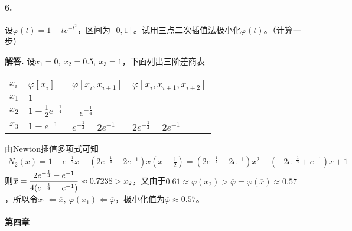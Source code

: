 \documentclass[12pt, a4paper, oneside]{ctexart}
\newenvironment{solution}{\par\noindent\textbf{解答. }}{\bigskip\par}
\begin{document}
\paragraph{6.}设$\varphi(t) = 1-te^{-t^2}$，区间为$[0,1]$。试用三点二次插值法极小化$\varphi(t)$。（计算一步）
\begin{solution}
    设$x_1=0,\ x_2 = 0.5,\ x_3 = 1$，下面列出三阶差商表
    \renewcommand\arraystretch{0.8} %
    \begin{table}[!htbp] %
        \centering %
        \begin{tabular}{p{1cm}<{\centering}p{3cm}<{\centering}p{4cm}<{\centering}p{5cm}<{\centering}} %
            \toprule
            $x_i$ & $\varphi[x_i]$ & $\varphi[x_i,x_{i+1}]$ & $\varphi[x_i,x_{i+1},x_{i+2}]$ \\
            \midrule
            $x_1$ & $1$ &                  &                          \\
            $x_2$ & $1-\frac{1}{2}e^{-\frac{1}{4}}$ & $-e^{-\frac{1}{4}}$        &                          \\
            $x_3$ & $1-e^{-1}$ & $e^{-\frac{1}{4}}-2e^{-1}$ & $2e^{-\frac{1}{4}}-2e^{-1}$\\
            \bottomrule
        \end{tabular}
    \end{table}

    由Newton插值多项式可知
    \begin{equation*}
        \begin{aligned}
            N_2(x) = 1-e^{-\frac{1}{4}}x+(2e^{-\frac{1}{4}}-2e^{-1})x(x-\frac{1}{2}) = (2e^{-\frac{1}{4}}-2e^{-1})x^{2}+(-2e^{-\frac{1}{4}}+e^{-1})x+1
        \end{aligned}
    \end{equation*}
    则$\displaystyle \overline{x}=\frac{2e^{-\frac{1}{4}}-e^{-1}}{4(e^{-\frac{1}{4}}-e^{-1})}\approx 0.7238 > x_2$，又由于$0.61\approx \varphi(x_2) >\overline{\varphi} = \varphi(\overline{x})\approx 0.57$，所以令$x_1\Leftarrow \overline{x},\ \varphi(x_1) \Leftarrow \overline{\varphi}$，极小化值为$\overline{\varphi}\approx 0.57$。

\end{solution}
\paragraph{第四章}
\end{document}

